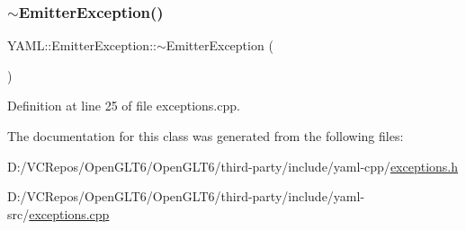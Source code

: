 \mbox{\label{class_y_a_m_l_1_1_emitter_exception_af70337d046f87e9ff995000dadf12bad}} 
\subsubsection{\texorpdfstring{$\sim$EmitterException()}{~EmitterException()}}
{\footnotesize\ttfamily Y\+A\+M\+L\+::\+Emitter\+Exception\+::$\sim$\+Emitter\+Exception (\begin{DoxyParamCaption}{ }\end{DoxyParamCaption})\hspace{0.3cm}{\ttfamily [virtual]}}



Definition at line 25 of file exceptions.\+cpp.



The documentation for this class was generated from the following files\+:\begin{DoxyCompactItemize}
\item 
D\+:/\+V\+C\+Repos/\+Open\+G\+L\+T6/\+Open\+G\+L\+T6/third-\/party/include/yaml-\/cpp/\mbox{\hyperlink{exceptions_8h}{exceptions.\+h}}\item 
D\+:/\+V\+C\+Repos/\+Open\+G\+L\+T6/\+Open\+G\+L\+T6/third-\/party/include/yaml-\/src/\mbox{\hyperlink{exceptions_8cpp}{exceptions.\+cpp}}\end{DoxyCompactItemize}
